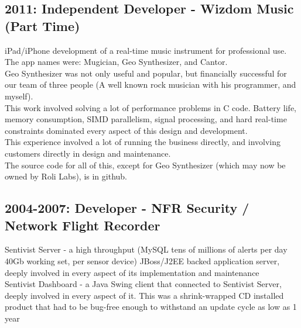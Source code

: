 \documentclass[margin]{res}
\begin{document}
\begin{resume}
\subsection{2011: Independent Developer - Wizdom Music (Part Time)}
iPad/iPhone development of a real-time music instrument for professional use. \\
The app names were: Mugician, Geo Synthesizer, and Cantor. \\
Geo Synthesizer was not only useful and popular, but financially successful for our team of three people (A well known rock musician with his programmer, and myself). \\
This work involved solving a lot of performance problems in C code.
Battery life, memory consumption, SIMD parallelism, signal processing,
and hard real-time constraints dominated every aspect of this design
and development. \\
This experience involved a lot of running the business directly, and involving customers directly in design and maintenance. \\
The source code for all of this, except for Geo Synthesizer (which may now be owned by Roli Labs), is in github.

\subsection{2004-2007: Developer - NFR Security / Network Flight Recorder}
Sentivist Server - a high throughput (MySQL tens of millions of alerts per day 40Gb working set, per sensor device) JBoss/J2EE backed application server,
deeply involved in every aspect of its implementation and maintenance \\
Sentivist Dashboard - a Java Swing client that connected to Sentivist Server,
deeply involved in every aspect of it. This was a shrink-wrapped CD installed
product that had to be bug-free enough to withstand an update cycle as low as
1 year \\


\end{resume}
\end{document}
